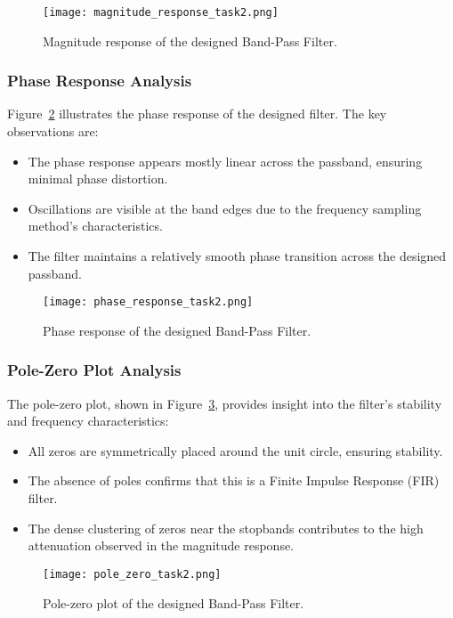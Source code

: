 \documentclass[a4paper,12pt]{article}
\begin{document}
\begin{figure}[H]
    \centering
    \texttt{[image: magnitude\_response\_task2.png]}
    \caption{Magnitude response of the designed Band-Pass Filter.}
    \label{fig:mag_response_task2}
\end{figure}

\subsubsection{Phase Response Analysis}
Figure~\ref{fig:phase_response_task2} illustrates the phase response of the designed filter. The key observations are:
\begin{itemize}
    \item The phase response appears mostly linear across the passband, ensuring minimal phase distortion.
    \item Oscillations are visible at the band edges due to the frequency sampling method’s characteristics.
    \item The filter maintains a relatively smooth phase transition across the designed passband.
\end{itemize}

\begin{figure}[H]
    \centering
    \texttt{[image: phase\_response\_task2.png]}
    \caption{Phase response of the designed Band-Pass Filter.}
    \label{fig:phase_response_task2}
\end{figure}

\subsubsection{Pole-Zero Plot Analysis}
The pole-zero plot, shown in Figure~\ref{fig:pole_zero_task2}, provides insight into the filter’s stability and frequency characteristics:
\begin{itemize}
    \item All zeros are symmetrically placed around the unit circle, ensuring stability.
    \item The absence of poles confirms that this is a Finite Impulse Response (FIR) filter.
    \item The dense clustering of zeros near the stopbands contributes to the high attenuation observed in the magnitude response.
\end{itemize}

\begin{figure}[H]
    \centering
    \texttt{[image: pole\_zero\_task2.png]}
    \caption{Pole-zero plot of the designed Band-Pass Filter.}
    \label{fig:pole_zero_task2}
\end{figure}
\end{document}
